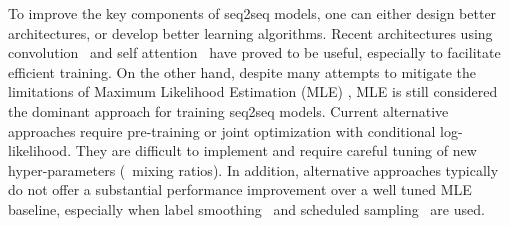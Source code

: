 To improve the key components of seq2seq models, one can either design better architectures,
or develop better learning algorithms. Recent
architectures using convolution~\citep{gehring-arxiv-2017} and self
attention~\citep{transformer2017} have proved to be useful, especially
to facilitate efficient training. On the other hand, despite many attempts to
mitigate the limitations of Maximum Likelihood Estimation (MLE)
\citep{ranzato-iclr-2016,wiseman-emnlp-2016,norouzi-nips-2016,bahdanau-iclr-2017,searnn2017},
MLE is still considered the dominant approach for training seq2seq
models. Current alternative approaches require pre-training or 
joint optimization with conditional log-likelihood. They are difficult to implement and
require careful tuning of new hyper-parameters (\eg~mixing ratios). In addition, alternative
approaches typically do not offer a substantial performance improvement over a well tuned MLE
baseline, especially when label smoothing~\citep{pereyra-iclr-2017,edunov2017classical} and
scheduled sampling~\citep{bengio-nips-2015} are used.

